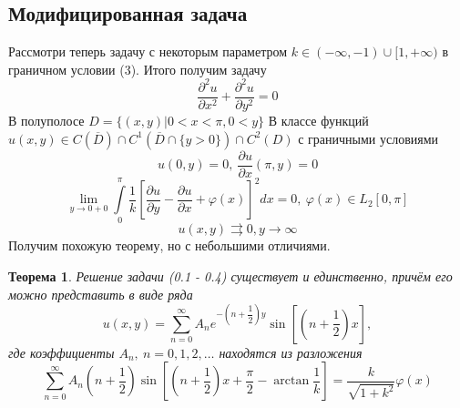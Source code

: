 \documentclass[10pt, a4paper]{extarticle}
\newtheorem{theorem}{Теорема}
\numberwithin{equation}{section}
\numberwithin{lemma}{section}
\numberwithin{definition}{section}
\numberwithin{notabene}{section}
\numberwithin{corollary}{section}
\begin{document}
	\subsection*{Модифицированная задача}
	Рассмотри теперь задачу с некоторым параметром $k \in (-\infty, -1) \cup [1, +\infty)$ в граничном условии (3). Итого получим задачу
	\begin{equation*}
		\dfrac{\partial^2 u}{\partial x^2} +\dfrac{\partial^2 u}{\partial y^2} = 0
	\end{equation*}
	В полуполосе $D = \{(x,y) \vert 0 < x < \pi, 0 < y\}$\newline
	В классе функций $u(x,y) \in C(\overline{D}) \cap C^1(\overline{D} \cap \{y > 0\}) \cap C^2 (D)$ \newline
	с граничными условиями
	\begin{equation*}
		u(0, y) = 0, \ \dfrac{\partial u}{\partial x} (\pi, y) = 0
	\end{equation*}
	\begin{equation}
		\lim\limits_{y \to 0 + 0} \int\limits_0^\pi \dfrac{1}{k}\left[\dfrac{\partial u}{\partial y} - \dfrac{\partial u}{\partial x} + \varphi(x) \right]^2 dx = 0, \ \varphi(x) \in L_2[0,\pi]
	\end{equation}
	\begin{equation*}
		u(x,y) \rightrightarrows 0, y \to \infty
	\end{equation*}
	Получим похожую теорему, но с небольшими отличиями.
		\begin{theorem}
		Решение задачи (0.1 - 0.4) существует и единственно, причём его можно представить в виде ряда
		\begin{equation*}
			u(x,y) = \sum\limits_{n=0}^{\infty} A_n e^{-\left(n + \dfrac12\right)y} \sin{\left[\left(n + \dfrac12\right)x\right]},
		\end{equation*}
		где коэффициенты $A_n, \ n =0,1,2, \dots$ находятся из разложения
		\begin{equation}
			\sum\limits_{n=0}^{\infty} A_n \left(n + \dfrac12 \right) \sin{\left[\left(n +\dfrac12\right)x + \dfrac\pi2 - \arctan{\dfrac{1}{k}}\right]} = \dfrac{k}{\sqrt{1+k^2}}\varphi(x)
		\end{equation}
	\end{theorem}	
\end{document}
